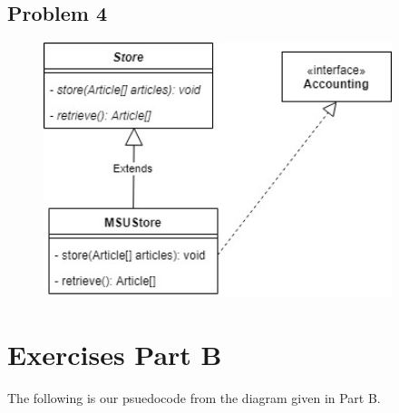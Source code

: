 \documentclass{article}
\begin{document}
\newpage

\subsection*{Problem 4}

\begin{figure}[h]
	\centering
	\includegraphics[width=4in]{Problem4.jpg}
\end{figure}

\newpage

\section*{Exercises Part B}

The following is our psuedocode from the diagram given in Part B. \\
\end{document}
